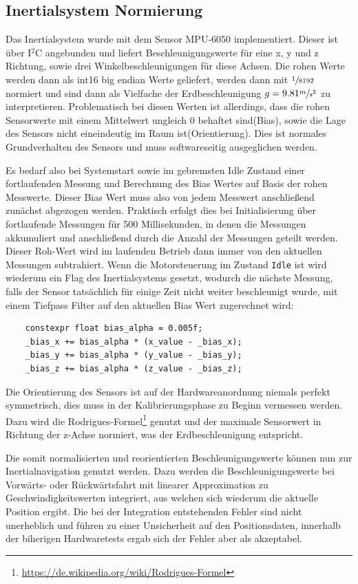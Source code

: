 \documentclass[
  a4paper,
  12pt,
  DIV=12,        %
  parskip=half,  %
  headings=small %
]{scrartcl}
\theoremstyle{definition}
\theoremstyle{definition}
\begin{document}
\subsection{Inertialsystem Normierung}

Das Inertialsystem wurde mit dem Sensor MPU-6050 implementiert. Dieser ist über I$^2$C angebunden und liefert Beschleunigungswerte für eine x, y und z Richtung, sowie drei Winkelbeschleunigungen für diese Achsen. Die rohen Werte werden dann als int16 big endian Werte geliefert, werden dann mit $\sfrac{1}{8192}$ normiert und sind dann als Vielfache der Erdbeschleunigung $g = 9.81 \sfrac{m}{s^2}$ zu interpretieren. Problematisch bei diesen Werten ist allerdings, dass die rohen Sensorwerte mit einem Mittelwert ungleich 0 behaftet sind(Bias), sowie die Lage des Sensors nicht eineindeutig im Raum ist(Orientierung). Dies ist normales Grundverhalten des Sensors und muss softwareseitig ausgeglichen werden.

Es bedarf also bei Systemstart sowie im gebremsten Idle Zustand einer fortlaufenden Messung und Berechnung des Bias Wertes auf Basis der rohen Messwerte. Dieser Bias Wert muss also von jedem Messwert anschließend zunächst abgezogen werden. Praktisch erfolgt dies bei Initialisierung über fortlaufende Messungen für 500 Millisekunden, in denen die Messungen akkumuliert und anschließend durch die Anzahl der Messungen geteilt werden. Dieser Roh-Wert wird im laufenden Betrieb dann immer von den aktuellen Messungen subtrahiert. Wenn die Motorsteuerung im Zustand \texttt{Idle} ist wird wiederum ein Flag des Inertialsystems gesetzt, wodurch die nächste Messung, falls der Sensor tatsächlich für einige Zeit nicht weiter beschleunigt wurde, mit einem Tiefpass Filter auf den aktuellen Bias Wert zugerechnet wird:

\begin{verbatim}
	constexpr float bias_alpha = 0.005f;
	_bias_x += bias_alpha * (x_value - _bias_x);
	_bias_y += bias_alpha * (y_value - _bias_y);
	_bias_z += bias_alpha * (z_value - _bias_z);
\end{verbatim}


Die Orientierung des Sensors ist auf der Hardwareanordnung niemals perfekt symmetrisch, dies muss in der Kalibrierungsphase zu Beginn vermessen werden. Dazu wird die Rodrigues-Formel\footnote{\url{https://de.wikipedia.org/wiki/Rodrigues-Formel}} genutzt und der maximale Sensorwert in Richtung der z-Achse normiert, was der Erdbeschleunigung entspricht.

Die somit normalisierten und reorientierten Beschleunigungswerte können nun zur Inertialnavigation genutzt werden. Dazu werden die Beschleunigungswerte bei Vorwärts- oder Rückwärtsfahrt mit linearer Approximation zu Geschwindigkeitswerten integriert, aus welchen sich wiederum die aktuelle Position ergibt. Die bei der Integration entstehenden Fehler sind nicht unerheblich und führen zu einer Unsicherheit auf den Positionsdaten, innerhalb der biherigen Hardwaretests ergab sich der Fehler aber als akzeptabel.
\end{document}
